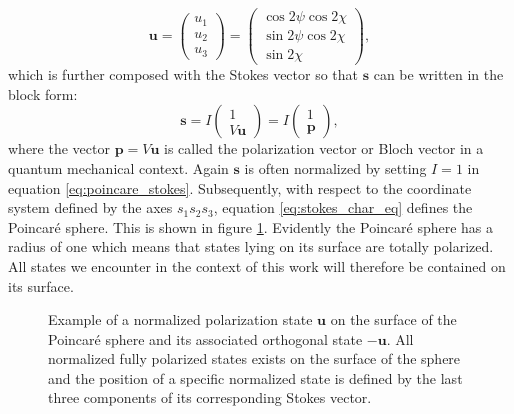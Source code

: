 \begin{equation}
    \bm{u}=
    \begin{pmatrix}
    u_1 \\
    u_2 \\
    u_3
    \end{pmatrix}
    =
    \begin{pmatrix}
    \cos 2\psi \cos 2\chi \\
    \sin 2\psi \cos 2\chi \\
    \sin 2\chi
    \end{pmatrix},
\end{equation}
which is further composed with the Stokes vector so that $\bm{s}$ can be written in the block form: %
\begin{equation}
    \label{eq:poincare_stokes}
    \bm{s}=I
    \begin{pmatrix}
    1 \\
    V \bm{u}
    \end{pmatrix}
    =I
    \begin{pmatrix}
    1 \\
    \bm{p}
    \end{pmatrix},
\end{equation}
where the vector $\bm{p}=V\bm{u}$ is called the polarization vector or Bloch vector in a quantum mechanical context. Again $\bm{s}$ is often normalized by setting $I=1$ in equation \ref{eq:poincare_stokes}. Subsequently, with respect to the coordinate system defined by the axes $s_1s_2s_3$, equation \ref{eq:stokes_char_eq} defines the Poincaré sphere. This is shown in figure \ref{fig:poincare_sphere_intro}. Evidently the Poincaré sphere has a radius of one which means that states lying on its surface are totally polarized. All states we encounter in the context of this work will therefore be contained on its surface.

\begin{figure}[h]
    \centering
    
    \caption{Example of a normalized polarization state $\bm{u}$ on the surface of the Poincaré sphere and its associated orthogonal state $-\bm{u}$. All normalized fully polarized states exists on the surface of the sphere and the position of a specific normalized state is defined by the last three components of its corresponding Stokes vector.}
    \label{fig:poincare_sphere_intro}
\end{figure}

